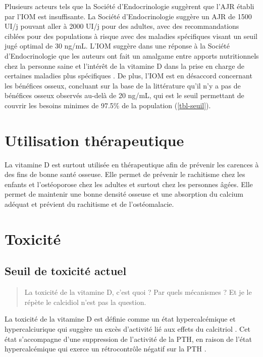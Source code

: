 \documentclass[
  a4paper,
  DIV=11,
  numbers=noendperiod,
  listof=totoc]{scrreprt}
\begin{document}
Plusieurs acteurs tels que la Société d'Endocrinologie suggèrent que
l'\ac{AJR} établi par l'\ac{IOM} est insuffisante. La Société
d'Endocrinologie suggère un \ac{AJR} de 1500 UI/j pouvant aller à 2000
UI/j pour des adultes, avec des recommandations ciblées pour des
populations à risque avec des maladies spécifiques visant un seuil jugé
optimal de 30 ng/mL. L'\ac{IOM} suggère dans une réponse à la Société
d'Endocrinologie que les auteurs ont fait un amalgame entre apports
nutritionnels chez la personne saine et l'intérêt de la vitamine D dans
la prise en charge de certaines maladies plus spécifiques
\autocite{Rosen.2012}. De plus, l'\ac{IOM} est en désaccord concernant
les bénéfices osseux, concluant sur la base de la littérature qu'il n'y
a pas de bénéfices osseux observés au-delà de 20 ng/mL, qui est le seuil
permettant de couvrir les besoins minimes de 97.5\% de la population
(\cref{tbl-seuil}).

\hypertarget{utilisation-thuxe9rapeutique}{%
\section{Utilisation thérapeutique}\label{utilisation-thuxe9rapeutique}}

La vitamine D est surtout utilisée en thérapeutique afin de prévenir les
carences à des fins de bonne santé osseuse. Elle permet de prévenir le
rachitisme chez les enfants et l'ostéoporose chez les adultes et surtout
chez les personnes âgées. Elle permet de maintenir une bonne densité
osseuse et une absorption du calcium adéquat et prévient du rachitisme
et de l'ostéomalacie.

\hypertarget{toxicituxe9}{%
\section{Toxicité}\label{toxicituxe9}}

\hypertarget{seuil-de-toxicituxe9-actuel}{%
\subsection{Seuil de toxicité
actuel}\label{seuil-de-toxicituxe9-actuel}}

\begin{quote}
La toxicité de la vitamine D, c'est quoi ? Par quels mécanismes ? Et je
le répète le calcidiol n'est pas la question.
\end{quote}

La toxicité de la vitamine D est définie comme un état hypercalcémique
et hypercalciurique qui suggère un excès d'activité lié aux effets du
calcitriol \autocite{Vieth.1990}. Cet état s'accompagne d'une
suppression de l'activité de la \ac{PTH}, en raison de l'état
hypercalcémique qui exerce un rétrocontrôle négatif sur la \ac{PTH}
\autocites[ ]{Marcinowska-Suchowierska.2018}{Dusso.2005}.
\end{document}
